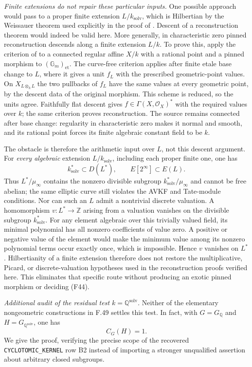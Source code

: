 \medskip
\noindent\emph{Finite extensions do not repair these particular inputs.}
One possible approach would pass to a proper finite extension
$L/k_{\mathrm{solv}}$, which is Hilbertian by the Weissauer theorem
used explicitly in the proof of \cite[Proposition~2.5]{F44Jarden2011}.
Descent of a reconstruction theorem would indeed be valid here.
More generally, in characteristic zero pinned reconstruction
descends along a finite extension $L/k$. To prove this, apply the
criterion of \cite[Theorem~4.18]{CHW2024} to a connected regular
affine $X/k$ with a rational point and a pinned morphism to
$(\mathbb G_m)_{\mathrm{et}}$. The curve-free criterion applies
after finite etale base change to $L$, where it gives a unit
$f_L$ with the prescribed geometric-point values. On
$X_{L\otimes_kL}$ the two pullbacks of $f_L$ have the same values
at every geometric point, by the descent data of the original
morphism. This scheme is reduced, so the units agree.
Faithfully flat descent gives $f\in\Gamma(X,\mathcal O_X)^*$
with the required values over $k$; the same criterion proves
reconstruction. The source remains connected after base change:
regularity in characteristic zero makes it normal and smooth,
and its rational point forces its finite algebraic constant field
to be $k$.

The obstacle is therefore the arithmetic input over $L$, not this
descent argument. For \emph{every algebraic} extension
$L/k_{\mathrm{solv}}$, including each proper finite one, one has
\[
 k_{\mathrm{solv}}^*\subset D(L^*),\qquad
 E[2^\infty]\subset E(L).
\]
Thus $L^*/\mu_\infty$ contains the nonzero divisible subgroup
$k_{\mathrm{solv}}^*/\mu_\infty$ and cannot be free abelian;
the same elliptic curve still violates the AVKF and Tate-module
conditions. Nor can such an $L$ admit a nontrivial discrete
valuation. A homomorphism $v:L^*\to\mathbb Z$ arising from a
valuation vanishes on the divisible subgroup $k_{\mathrm{solv}}^*$.
For any element algebraic over this trivially valued field, its
minimal polynomial has all nonzero coefficients of value zero.
A positive or negative value of the element would make the
minimum value among its nonzero polynomial terms occur exactly
once, which is impossible. Hence $v$ vanishes on $L^*$.
Hilbertianity of a finite extension therefore does not restore
the multiplicative, Picard, or discrete-valuation hypotheses used
in the reconstruction proofs verified here. This eliminates that
specific route without producing an exotic pinned morphism or
deciding (F44).


\medskip
\noindent\emph{Additional audit of the residual test
$k=\mathbb Q^{\mathrm{solv}}$.}
Neither of the elementary nongeometric constructions in F.49 settles
this test. In fact, with $G=G_{\mathbb Q}$ and
$H=G_{\mathbb Q^{\mathrm{solv}}}$, one has
\[
                         C_G(H)=1.                         \tag{F44.C1}
\]
We give the proof, verifying the precise scope of the recovered
\texttt{CYCLOTOMIC\_KERNEL} row B2 instead of importing a stronger
unqualified assertion about arbitrary closed subgroups.

